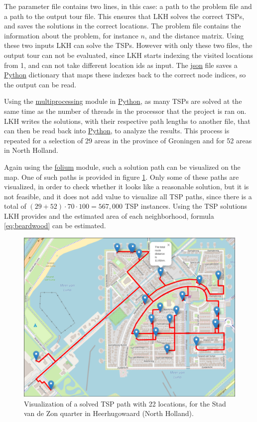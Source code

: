 \documentclass[12pt]{article}
\numberwithin{equation}{section}
\newcommand{\1}[1]{\,I_{#1}} %
\begin{document}
The parameter file contains two lines, in this case: a path to the problem file and a path to the
output tour file. This ensures that LKH solves the correct TSPs, and saves the solutions in the 
correct locations. The problem file contains the information about the problem, for instance
$n$, and the distance matrix. Using these two inputs LKH can solve the TSPs. However with only these 
two files, the output tour can not be evaluated, since LKH starts indexing the visited locations
from 1, and can not take different location ids as input. The \url{json} file saves a \url{Python}
dictionary that maps these indexes back to the correct node indices, so the output can be read.

Using the \url{multiprocessing} module in \url{Python}, as many TSPs are solved at the same time
as the number of threads in the processor that the project is ran on. LKH writes the solutions,
with their respective path lengths to another file, that can then be read back into \url{Python},
to analyze the results. This process is repeated for a selection of 29 areas in the province of
Groningen and for 52 areas in North Holland.

Again using the \url{folium} module, such a solution path can be visualized on the map. One of such
paths is provided in figure \ref{fig:tsp_stadvdzon}. Only some of these paths are visualized,
in order to check whether it looks like a reasonable solution, but it is not feasible, and it does
not add value to visualize all TSP paths, since there is a total of 
$(29+52)\cdot70\cdot100=567,000$ TSP instances.
Using the TSP solutions LKH provides and the estimated area of each neighborhood, formula 
\ref{eq:beardwood} can be estimated.
\begin{figure}[H]
  \caption{Visualization of a solved TSP path with 22 locations, for the Stad van de Zon quarter in 
  Heerhugowaard (North Holland).}
  \label{fig:tsp_stadvdzon}
  \includegraphics[width=\textwidth]{Pictures/TSP_22_Stad_van_de_Zon.png}
\end{figure}
\end{document}
